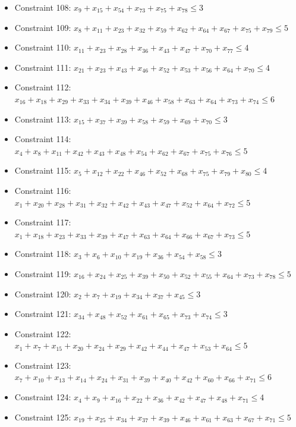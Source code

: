 \documentclass[11pt]{article}
\begin{document}
\begin{itemize}
\item Constraint 108: $x_{9} + x_{15} + x_{54} + x_{73} + x_{75} + x_{78} \le 3$
\item Constraint 109: $x_{8} + x_{11} + x_{23} + x_{32} + x_{59} + x_{62} + x_{64} + x_{67} + x_{75} + x_{79} \le 5$
\item Constraint 110: $x_{11} + x_{23} + x_{28} + x_{36} + x_{43} + x_{47} + x_{70} + x_{77} \le 4$
\item Constraint 111: $x_{21} + x_{23} + x_{43} + x_{46} + x_{52} + x_{53} + x_{56} + x_{64} + x_{70} \le 4$
\item Constraint 112: $x_{16} + x_{18} + x_{29} + x_{33} + x_{34} + x_{39} + x_{46} + x_{58} + x_{63} + x_{64} + x_{73} + x_{74} \le 6$
\item Constraint 113: $x_{15} + x_{37} + x_{39} + x_{58} + x_{59} + x_{69} + x_{70} \le 3$
\item Constraint 114: $x_{4} + x_{8} + x_{11} + x_{42} + x_{43} + x_{48} + x_{54} + x_{62} + x_{67} + x_{75} + x_{76} \le 5$
\item Constraint 115: $x_{5} + x_{12} + x_{22} + x_{46} + x_{52} + x_{68} + x_{75} + x_{79} + x_{80} \le 4$
\item Constraint 116: $x_{1} + x_{20} + x_{28} + x_{31} + x_{32} + x_{42} + x_{43} + x_{47} + x_{52} + x_{64} + x_{72} \le 5$
\item Constraint 117: $x_{1} + x_{18} + x_{23} + x_{33} + x_{39} + x_{47} + x_{63} + x_{64} + x_{66} + x_{67} + x_{73} \le 5$
\item Constraint 118: $x_{3} + x_{6} + x_{10} + x_{19} + x_{36} + x_{54} + x_{58} \le 3$
\item Constraint 119: $x_{16} + x_{24} + x_{25} + x_{39} + x_{50} + x_{52} + x_{55} + x_{64} + x_{73} + x_{78} \le 5$
\item Constraint 120: $x_{2} + x_{7} + x_{19} + x_{34} + x_{37} + x_{45} \le 3$
\item Constraint 121: $x_{34} + x_{48} + x_{52} + x_{61} + x_{65} + x_{73} + x_{74} \le 3$
\item Constraint 122: $x_{1} + x_{7} + x_{15} + x_{20} + x_{24} + x_{29} + x_{42} + x_{44} + x_{47} + x_{53} + x_{64} \le 5$
\item Constraint 123: $x_{7} + x_{10} + x_{13} + x_{14} + x_{24} + x_{31} + x_{39} + x_{40} + x_{42} + x_{60} + x_{66} + x_{71} \le 6$
\item Constraint 124: $x_{4} + x_{9} + x_{16} + x_{22} + x_{36} + x_{42} + x_{47} + x_{48} + x_{71} \le 4$
\item Constraint 125: $x_{19} + x_{25} + x_{34} + x_{37} + x_{39} + x_{46} + x_{61} + x_{63} + x_{67} + x_{71} \le 5$

\end{itemize}
\end{document}
